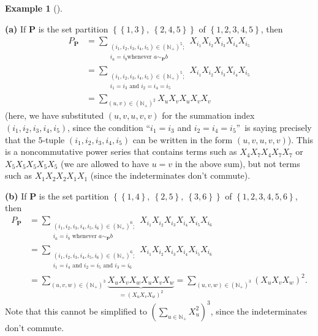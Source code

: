 \documentclass[numbers=enddot,12pt,final,onecolumn,notitlepage]{scrartcl}%
\theoremstyle{definition}
\newtheorem{exmp}[theo]{Example}
\newenvironment{example}[1][]
{\begin{exmp}[#1]\begin{leftbar}}
{\end{leftbar}\end{exmp}}
\let\sumnonlimits\sum
\renewcommand{\sum}{\sumnonlimits\limits}
\begin{document}
\begin{example}
\textbf{(a)} If $\mathbf{P}$ is the set partition $\left\{  \left\{
1,3\right\}  ,\ \left\{  2,4,5\right\}  \right\}  $ of $\left\{
1,2,3,4,5\right\}  $, then
\begin{align*}
P_{\mathbf{P}}  &  =\sum_{\substack{\left(  i_{1},i_{2},i_{3},i_{4}%
,i_{5}\right)  \in\left(  \mathbb{N}_{+}\right)  ^{5};\\i_{a}=i_{b}\text{
whenever }a\sim_{\mathbf{P}}b}}X_{i_{1}}X_{i_{2}}X_{i_{3}}X_{i_{4}}X_{i_{5}}\\
&  =\sum_{\substack{\left(  i_{1},i_{2},i_{3},i_{4},i_{5}\right)  \in\left(
\mathbb{N}_{+}\right)  ^{5};\\i_{1}=i_{3}\text{ and }i_{2}=i_{4}=i_{5}%
}}X_{i_{1}}X_{i_{2}}X_{i_{3}}X_{i_{4}}X_{i_{5}}\\
&  =\sum_{\left(  u,v\right)  \in\left(  \mathbb{N}_{+}\right)  ^{2}}%
X_{u}X_{v}X_{u}X_{v}X_{v}%
\end{align*}
(here, we have substituted $\left(  u,v,u,v,v\right)  $ for the summation
index $\left(  i_{1},i_{2},i_{3},i_{4},i_{5}\right)  $, since the condition
\textquotedblleft$i_{1}=i_{3}$ and $i_{2}=i_{4}=i_{5}$\textquotedblright\ is
saying precisely that the $5$-tuple $\left(  i_{1},i_{2},i_{3},i_{4}%
,i_{5}\right)  $ can be written in the form $\left(  u,v,u,v,v\right)  $).
This is a noncommutative power series that contains terms such as $X_{4}%
X_{7}X_{4}X_{7}X_{7}$ or $X_{5}X_{5}X_{5}X_{5}X_{5}$ (we are allowed to have
$u=v$ in the above sum), but not terms such as $X_{1}X_{2}X_{2}X_{1}X_{1}$
(since the indeterminates don't commute).

\textbf{(b)} If $\mathbf{P}$ is the set partition $\left\{  \left\{
1,4\right\}  ,\ \left\{  2,5\right\}  ,\ \left\{  3,6\right\}  \right\}  $ of
$\left\{  1,2,3,4,5,6\right\}  $, then
\begin{align*}
P_{\mathbf{P}}  &  =\sum_{\substack{\left(  i_{1},i_{2},i_{3},i_{4}%
,i_{5},i_{6}\right)  \in\left(  \mathbb{N}_{+}\right)  ^{6};\\i_{a}%
=i_{b}\text{ whenever }a\sim_{\mathbf{P}}b}}X_{i_{1}}X_{i_{2}}X_{i_{3}%
}X_{i_{4}}X_{i_{5}}X_{i_{6}}\\
&  =\sum_{\substack{\left(  i_{1},i_{2},i_{3},i_{4},i_{5},i_{6}\right)
\in\left(  \mathbb{N}_{+}\right)  ^{6};\\i_{1}=i_{4}\text{ and }i_{2}%
=i_{5}\text{ and }i_{3}=i_{6}}}X_{i_{1}}X_{i_{2}}X_{i_{3}}X_{i_{4}}X_{i_{5}%
}X_{i_{6}}\\
&  =\sum_{\left(  u,v,w\right)  \in\left(  \mathbb{N}_{+}\right)  ^{3}%
}\underbrace{X_{u}X_{v}X_{w}X_{u}X_{v}X_{w}}_{=\left(  X_{u}X_{v}X_{w}\right)
^{2}}=\sum_{\left(  u,v,w\right)  \in\left(  \mathbb{N}_{+}\right)  ^{3}%
}\left(  X_{u}X_{v}X_{w}\right)  ^{2}.
\end{align*}
Note that this cannot be simplified to $\left(  \sum_{u\in\mathbb{N}_{+}}%
X_{u}^{2}\right)  ^{3}$, since the indeterminates don't commute.


\end{example}
\end{document}
